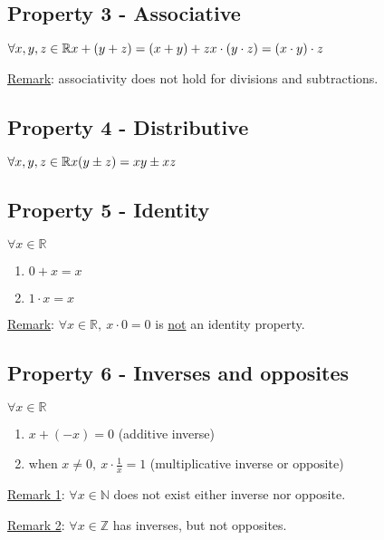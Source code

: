 \documentclass{article}
\begin{document}
\subsection{Property 3 - Associative}
$\forall x,y,z \in \mathbb{R}\\
x+(y+z) = (x+y)+z\\
x \cdot (y\cdot z)=(x\cdot y)\cdot z$

\underline{Remark}: associativity does not hold for divisions and
subtractions.

\subsection{Property 4 - Distributive}
$\forall x,y,z \in \mathbb{R}\\
x(y \pm z)=xy \pm xz$

\subsection{Property 5 - Identity}
$\forall x \in \mathbb{R}$
\begin{enumerate}[label=\alph*)]
    \item $0+x=x$
    \item $1 \cdot x=x$
\end{enumerate}

\underline{Remark}: $\forall x \in \mathbb{R},\ x \cdot 0=0$ is
\underline{not} an identity property.

\subsection{Property 6 - Inverses and opposites}
$\forall x \in \mathbb{R}$
\begin{enumerate}[label=\alph*)]
    \item $x+(-x)=0$ (additive inverse)
    \item when $x \neq 0,\ x \cdot \frac{1}{x}=1$ (multiplicative inverse or opposite)
\end{enumerate}

\underline{Remark 1}: $\forall x \in \mathbb{N}$ does not exist either
inverse nor opposite.

\underline{Remark 2}: $\forall x \in \mathbb{Z}$ has inverses, but
not opposites.
\end{document}

